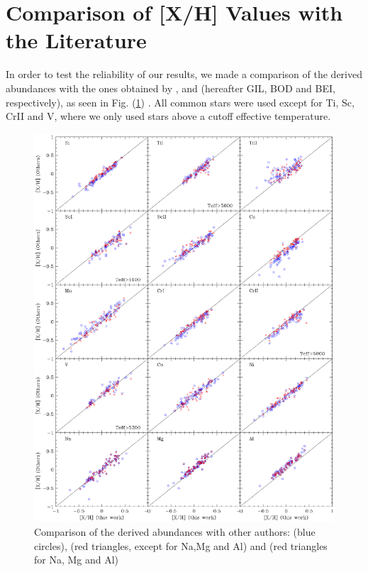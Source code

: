 \documentclass[dvips,12pt,a4paper]{report}
\begin{document}
{{\section{Comparison of [X/H] Values with the Literature}

In order to test the reliability of our results, we made a comparison of the derived abundances with the ones obtained by \citet{Gilli-2006}, \citet{Bodaghee-2003} and \citet{Beirao-2005} (hereafter GIL, BOD and BEI, respectively), as seen in Fig. (\ref{gfxcomparison}) . All common stars were used except for Ti, Sc, CrII and V, where we only used stars above a cutoff effective temperature.

\begin{figure}[h!]
\centering
\includegraphics[trim=0cm 2cm 0cm 1cm,clip,width=15 cm]{pics/parte4/comp.eps}
\caption[Comparison of abundances with other authors]{Comparison of the derived abundances with other authors: \citet{Gilli-2006} (blue circles), \citet{Bodaghee-2003} (red triangles, except for Na,Mg and Al) and \citet{Beirao-2005} (red triangles for Na, Mg and Al)  }
\label{gfxcomparison}
\end{figure}



}}
\end{document}
